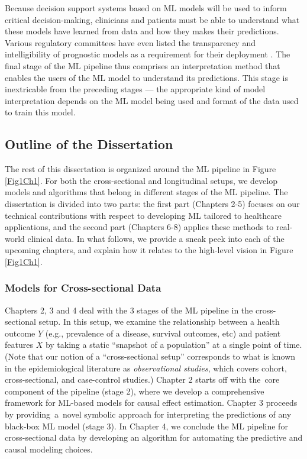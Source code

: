 \documentclass [PhD] {uclathes}
\begin{document}
Because decision support systems based on ML models will be used to inform critical decision-making, clinicians and patients must be able to understand what these models have learned from data and how they makes their predictions. Various regulatory committees have even listed the transparency and intelligibility of prognostic models as a requirement for their deployment \cite{kattan2016american}. The final stage of the ML pipeline thus comprises an interpretation method that enables the users of the ML model to understand its predictions. This stage is inextricable from the preceding stages --- the appropriate kind of model interpretation depends on the ML model being used and format of the data used to train this model. 

\subsection{Outline of the Dissertation}
The rest of this dissertation is organized around the ML pipeline in Figure \ref{Fig1Ch1}. For both the cross-sectional and longitudinal setups, we develop models and algorithms that belong in different stages of the ML pipeline. The dissertation is divided into two parts: the first part (Chapters 2-5) focuses on our technical contributions with respect to developing ML tailored to healthcare applications, and the second part (Chapters 6-8) applies these methods to real-world clinical data. In what follows, we provide a sneak peek into each of the upcoming chapters, and explain how it relates to the high-level vision in Figure \ref{Fig1Ch1}.  

\label{Sec112}
\subsubsection{Models for Cross-sectional Data} %
Chapters 2, 3 and 4 deal with the 3 stages of the ML pipeline in the cross-sectional setup. In this setup, we examine the relationship between a health outcome $Y$ (e.g., prevalence of a disease, survival outcomes, etc) and patient features $X$ by taking a static ``snapshot of a population'' at a single point of time. (Note that our notion of a ``cross-sectional setup'' corresponds to what is known in the epidemiological literature as \textit{observational studies}, which covers cohort, cross-sectional, and case-control studies.) Chapter 2 starts off with the~core component of the pipeline (stage 2), where we develop a comprehensive framework for ML-based models for causal effect estimation. Chapter 3 proceeds by providing~a~novel symbolic approach for interpreting the predictions of any black-box ML model (stage 3). In Chapter 4, we conclude the ML pipeline for cross-sectional data by developing an algorithm for automating the predictive and causal modeling choices.
\end{document}

